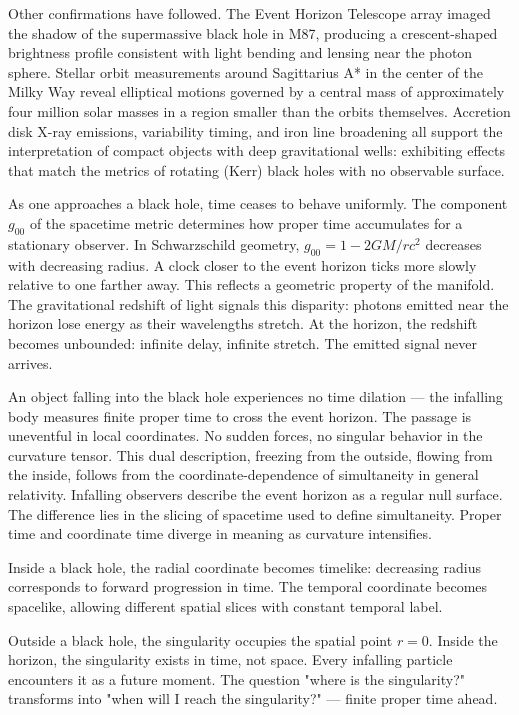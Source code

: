 Other confirmations have followed. The Event Horizon Telescope array imaged the shadow of the supermassive black hole in M87, producing a crescent-shaped brightness profile consistent with light bending and lensing near the photon sphere. Stellar orbit measurements around Sagittarius A* in the center of the Milky Way reveal elliptical motions governed by a central mass of approximately four million solar masses in a region smaller than the orbits themselves. Accretion disk X-ray emissions, variability timing, and iron line broadening all support the interpretation of compact objects with deep gravitational wells: exhibiting effects that match the metrics of rotating (Kerr) black holes with no observable surface.


As one approaches a black hole, time ceases to behave uniformly. The component $g_{00}$ of the spacetime metric determines how proper time accumulates for a stationary observer. In Schwarzschild geometry, $g_{00} = 1 - 2GM/rc^2$ decreases with decreasing radius. A clock closer to the event horizon ticks more slowly relative to one farther away. This reflects a geometric property of the manifold. The gravitational redshift of light signals this disparity: photons emitted near the horizon lose energy as their wavelengths stretch. At the horizon, the redshift becomes unbounded: infinite delay, infinite stretch. The emitted signal never arrives.


An object falling into the black hole experiences no time dilation — the infalling body measures finite proper time to cross the event horizon. The passage is uneventful in local coordinates. No sudden forces, no singular behavior in the curvature tensor. This dual description, freezing from the outside, flowing from the inside, follows from the coordinate-dependence of simultaneity in general relativity. Infalling observers describe the event horizon as a regular null surface. The difference lies in the slicing of spacetime used to define simultaneity. Proper time and coordinate time diverge in meaning as curvature intensifies.


Inside a black hole, the radial coordinate becomes timelike: decreasing radius corresponds to forward progression in time. The temporal coordinate becomes spacelike, allowing different spatial slices with constant temporal label.

Outside a black hole, the singularity occupies the spatial point $r = 0$. Inside the horizon, the singularity exists in time, not space. Every infalling particle encounters it as a future moment. The question "where is the singularity?" transforms into "when will I reach the singularity?" — finite proper time ahead.

